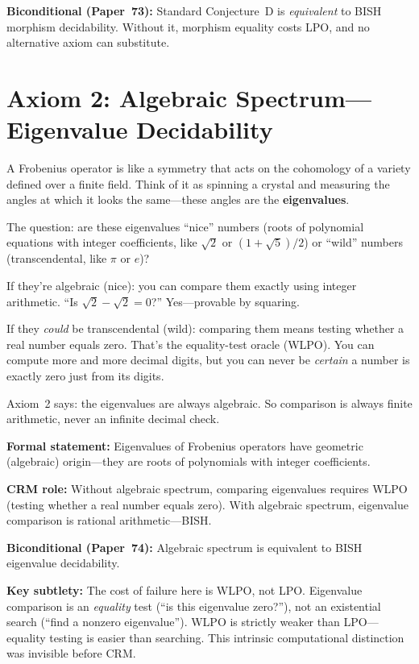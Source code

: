 \documentclass[11pt,twoside,openany]{report}
\theoremstyle{remark}
\newcommand{\BISH}{\textsf{BISH}}
\newcommand{\WLPO}{\textsf{WLPO}}
\newcommand{\LPO}{\textsf{LPO}}
\newcommand{\paperref}[1]{\textbf{Paper~#1}}
\begin{document}
\textbf{Biconditional (\paperref{73}):} Standard Conjecture~D is \emph{equivalent} to \BISH{} morphism decidability. Without it, morphism equality costs \LPO, and no alternative axiom can substitute.


\section{Axiom 2: Algebraic Spectrum---Eigenvalue Decidability}

\begin{analogybox}
A Frobenius operator is like a symmetry that acts on the cohomology of a variety defined over a finite field. Think of it as spinning a crystal and measuring the angles at which it looks the same---these angles are the \textbf{eigenvalues}.

The question: are these eigenvalues ``nice'' numbers (roots of polynomial equations with integer coefficients, like $\sqrt{2}$ or $(1+\sqrt{5})/2$) or ``wild'' numbers (transcendental, like $\pi$ or $e$)?

If they're algebraic (nice): you can compare them exactly using integer arithmetic. ``Is $\sqrt{2} - \sqrt{2} = 0$?'' Yes---provable by squaring.

If they \emph{could} be transcendental (wild): comparing them means testing whether a real number equals zero. That's the equality-test oracle (\WLPO). You can compute more and more decimal digits, but you can never be \emph{certain} a number is exactly zero just from its digits.

Axiom~2 says: the eigenvalues are always algebraic. So comparison is always finite arithmetic, never an infinite decimal check.
\end{analogybox}

\textbf{Formal statement:} Eigenvalues of Frobenius operators have geometric (algebraic) origin---they are roots of polynomials with integer coefficients.

\textbf{CRM role:} Without algebraic spectrum, comparing eigenvalues requires \WLPO{} (testing whether a real number equals zero). With algebraic spectrum, eigenvalue comparison is rational arithmetic---\BISH.

\textbf{Biconditional (\paperref{74}):} Algebraic spectrum is equivalent to \BISH{} eigenvalue decidability.

\textbf{Key subtlety:} The cost of failure here is \WLPO, not \LPO. Eigenvalue comparison is an \emph{equality} test (``is this eigenvalue zero?''), not an existential search (``find a nonzero eigenvalue''). \WLPO{} is strictly weaker than \LPO---equality testing is easier than searching. This intrinsic computational distinction was invisible before CRM.
\end{document}
